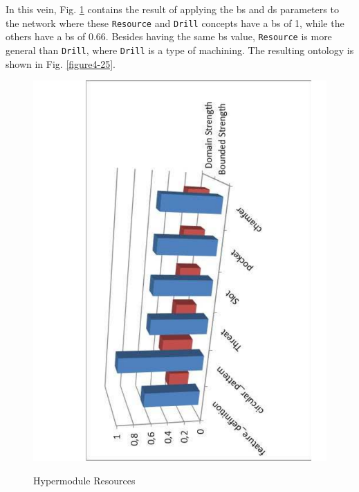 In this vein, Fig. \ref{figure4-24} contains the result of applying the \gls{bs} and \gls{ds} parameters to the network where these \texttt{Resource} and \texttt{Drill} concepts have a \gls{bs} of 1, while the others have a \gls{bs} of 0.66. Besides having the same \gls{bs} value, \texttt{Resource} is more general than \texttt{Drill}, where \texttt{Drill} is a type of machining. The resulting ontology is shown in Fig. \ref{figure4-25}.


\begin{figure}
\begin{center}
	\includegraphics[scale=0.5, angle=-90]{figure-chapterIV/fig4-24.pdf}\\
	\caption{Hypermodule Resources}
	\label{figure4-24}
\end{center}
\end{figure}

